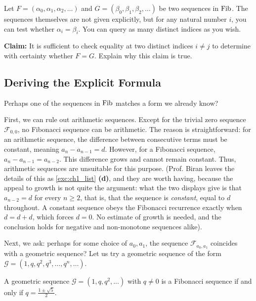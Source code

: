 \begin{exercise}
\label{exc:fib_dimension_two_samples}
Let $F = (\alpha_0, \alpha_1, \alpha_2, \dots)$ and $G = (\beta_0, \beta_1, \beta_2, \dots)$ be two sequences in $\operatorname{Fib}$. The sequences themselves are not given explicitly, but for any natural number $i$, you can test whether $\alpha_i = \beta_i$. You can query as many distinct indices as you wish.

\textbf{Claim:} It is sufficient to check equality at two distinct indices $i \ne j$ to determine with certainty whether $F = G$. Explain why this claim is true.
\end{exercise}

\subsection{Deriving the Explicit Formula}

Perhaps one of the sequences in $\operatorname{Fib}$ matches a form we already know? 

First, we can rule out arithmetic sequences. Except for the trivial zero sequence $\mathcal{F}_{0,0}$, no Fibonacci sequence can be arithmetic. The reason is straightforward: for an arithmetic sequence, the difference between consecutive terms must be constant, meaning $a_n - a_{n-1} = d$. However, for a Fibonacci sequence, $a_n - a_{n-1} = a_{n-2}$. This difference grows and cannot remain constant. Thus, arithmetic sequences are unsuitable for this purpose.
(Prof. Biran leaves the details of this as \cref{exc:ch1_list} \textbf{(d)}, and they are worth having, because the appeal to growth is not quite the argument: what the two displays give is that $a_{n-2} = d$ for every $n \ge 2$, that is, that the sequence is \emph{constant}, equal to $d$ throughout. A constant sequence obeys the Fibonacci recurrence exactly when $d = d + d$, which forces $d = 0$. No estimate of growth is needed, and the conclusion holds for negative and non-monotone sequences alike).

Next, we ask: perhaps for some choice of $a_0, a_1$, the sequence $\mathcal{F}_{a_0, a_1}$ coincides with a geometric sequence? Let us try a geometric sequence of the form $\mathcal{G} = (1, q, q^2, q^3, \dots, q^n, \dots)$. 

\begin{lemma}
\label{lem:geometric_fibonacci}
A geometric sequence $\mathcal{G} = (1, q, q^2, \dots)$ with $q \ne 0$ is a Fibonacci sequence if and only if $q = \frac{1 \pm \sqrt{5}}{2}$.
\end{lemma}


